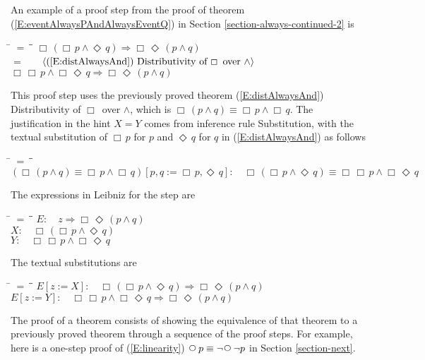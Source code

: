 \documentclass[12pt, fleqn, leqno]{article}
\newcommand{\lgap}{2pt}                             %
\newcommand{\mymathindent}{24pt}                    %
\newcommand{\impl}{\ensuremath{\Rightarrow}}        %
\newcommand{\Next}{\;\,\text{\raisebox{3.5pt}{\circle{6}}}}
\newcommand{\Event}{\Diamond\,}
\newcommand{\Always}{\Box\,}
\newcommand{\myqedtab}{\hspace{384pt}}              %
\newcommand{\Gll} {\langle}                         %
\newcommand{\Ggg} {\rangle}                         %
\newcommand{\Hint}[1]     {\ \ \ $\Gll              \mbox{#1} \Ggg$ }   %
\begin{document}
An example of a proof step from the proof of theorem (\ref{E:eventAlwaysPAndAlwaysEventQ}) in Section \ref{section-always-continued-2} is
\begin{tabbing}
\hspace{\mymathindent} \= $= \;$ \= \myqedtab \= \kill
\> \>   $\Always (\Always p \land \Event q) \impl \Always\Event (p \land q)$\\[\lgap]
\> $=$  \>  \Hint{(\ref{E:distAlwaysAnd}) Distributivity of $\Always$ over $\land$}\\[\lgap]
\> \>   $\Always \Always p \land \Always\Event q \impl \Always\Event (p \land q)$
\end{tabbing}
This proof step uses the previously proved theorem (\ref{E:distAlwaysAnd}) Distributivity of $\Always$ over $\land$,
which is $\Always (p \land q) \equiv \Always p \land \Always q$.
The justification in the hint $X=Y$ comes from inference rule Substitution, with the textual substitution of $\Always p$ for $p$ and $\Event q$ for $q$ in (\ref{E:distAlwaysAnd}) as follows
\begin{tabbing}
\hspace{\mymathindent} \= $= \;$ \= \myqedtab \= \kill
  \> $(\Always (p \land q) \equiv \Always p \land \Always q)[p,q:=\Always p, \Event q]:\quad \Always (\Always p \land \Event q) \equiv \Always \Always p \land \Always \Event q$
\end{tabbing}
The expressions in Leibniz for the step are
\begin{tabbing}
\hspace{\mymathindent} \= $= \;$ \= \myqedtab \= \kill
  \> $E:\quad z \impl \Always\Event (p \land q)$\\[\lgap]
  \> $X:\quad \Always (\Always p \land \Event q)$\\[\lgap]
  \> $Y:\quad \Always \Always p \land \Always \Event q$
\end{tabbing}
The textual substitutions are
\begin{tabbing}
\hspace{\mymathindent} \= $= \;$ \= \myqedtab \= \kill
  \> $E[z:=X]:\quad \Always (\Always p \land \Event q) \impl \Always\Event (p \land q)$\\[\lgap]
  \> $E[z:=Y]:\quad \Always \Always p \land \Always\Event q \impl \Always\Event (p \land q)$
\end{tabbing}

The proof of a theorem consists of showing the equivalence of that theorem to a previously proved theorem
through a sequence of the proof steps.
For example, here is a one-step proof of (\ref{E:linearity}) $\Next p \equiv \neg\Next\neg p$ in Section \ref{section-next}.
\end{document}
